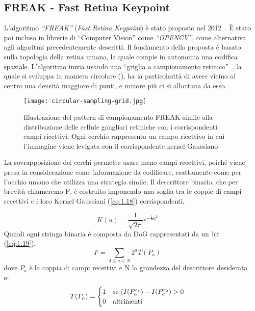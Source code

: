 \subsection{FREAK - Fast Retina Keypoint}
L'algoritmo \textit{``FREAK''} (\textit{Fast Retina Keypoint}) è stato proposto nel 2012~\cite{6247715}. È stato poi incluso in librerie di ``Computer Vision'' come \textit{``OPENCV''}, come alternativa agli algoritmi precedentemente descritti. Il fondamento della proposta è basato sulla topologia della retina umana, la quale compie in autonomia una codifica spaziale. L'algoritmo inizia usando una ``griglia a campionamento retinico''~\cite{6247715}, la quale si sviluppa in maniera circolare (), ha la particolarità di avere vicino al centro una densità maggiore di punti, e minore più ci si allontana da esso.
\begin{figure}[H]
    \centering
    \texttt{[image: circular-sampling-grid.jpg]}
    \caption{Illustrazione del pattern di campionamento FREAK simile alla distribuzione delle cellule gangliari retiniche con i corrispondenti campi ricettivi. Ogni cerchio rappresenta un campo ricettivo in cui l'immagine viene levigata con il corrispondente kernel Gaussiano~\cite{6247715}}
    \label{fig:5}
\end{figure}
\noindent La sovrapposizione dei cerchi permette usare meno campi recettivi, poiché viene presa in considerazione come informazione da codificare, esattamente come per l'occhio umano che utilizza una strategia simile.  Il descrittore binario, che per brevità chiameremo F, è costruito imponendo una soglia tra le coppie di campi recettivi e i loro Kernel Gaussiani (\ref{eq:1.18}) corrispondenti. \par
\begin{equation}
    {\displaystyle K(u)={\frac {1}{\sqrt {2\pi }}}e^{-{\frac {1}{2}}u^{2}}} \label{eq:1.18}
\end{equation}
\noindent Quindi ogni stringa binaria è composta da DoG rappresentati da un bit (\ref{eq:1.19}).
\begin{equation}
    F=\sum_{0\leq a < N}2^{a}T(P_{a}) \label{eq:1.19}
\end{equation}
\noindent dove \textit{\(P_{a}\)} è la coppia di campi recettivi e N la grandezza del descrittore desiderata e:
\begin{equation}
    T(P_{a})=\begin{cases}
       1 & \text{se \( (I(P_{a}^{r_{1}})-I(P_{a}^{r_{2}}) > 0 \)}  \\
       0 & \text{altrimenti}
    \end{cases}
\end{equation}
